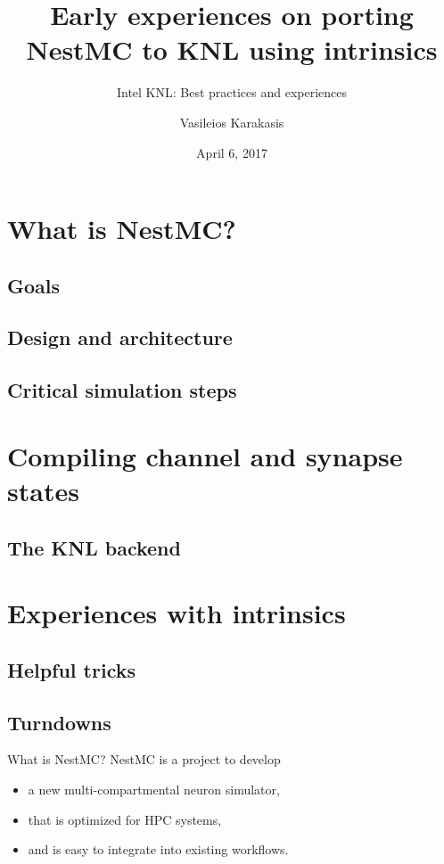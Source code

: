 \documentclass[aspectratio=1610,14pt]{beamer}
\author{Vasileios Karakasis}
\title{Early experiences on porting NestMC to KNL using intrinsics}
\subtitle{Intel KNL: Best practices and experiences}
\date{April 6, 2017}
\begin{document}
\cscstitle


\section{What is NestMC?}
\subsection{Goals}
\subsection{Design and architecture}
\subsection{Critical simulation steps}
\section{Compiling channel and synapse states}
\subsection{The KNL backend}
\section{Experiences with intrinsics}
\subsection{Helpful tricks}
\subsection{Turndowns}


\begin{frame}{What is NestMC?}
  NestMC is a project to develop
  \begin{itemize}
  \item a new multi-compartmental neuron simulator,
  \item that is optimized for HPC systems,
  \item and is easy to integrate into existing workflows.
  \end{itemize}
\end{frame}
\end{document}
